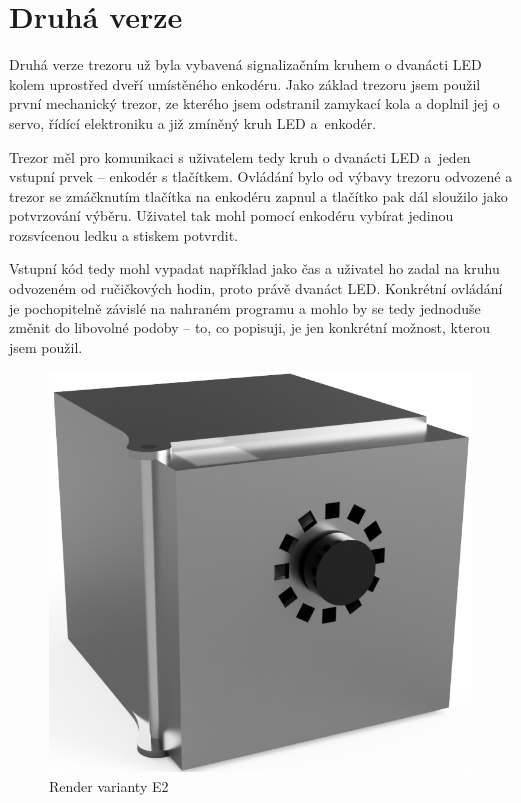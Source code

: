 \section{Druhá verze}


Druhá verze trezoru už byla vybavená signalizačním kruhem o dvanácti LED kolem uprostřed dveří
umístěného enkodéru. Jako základ trezoru jsem použil první mechanický trezor, %
 ze kterého jsem odstranil zamykací kola 
a doplnil jej o servo, řídící elektroniku a již zmíněný kruh LED a~enkodér.

Trezor měl pro komunikaci s uživatelem tedy kruh o dvanácti LED a~jeden vstupní prvek -- enkodér s tlačítkem.
Ovládání bylo od výbavy trezoru odvozené a trezor se zmáčknutím tlačítka na enkodéru zapnul a tlačítko pak dál sloužilo jako potvrzování výběru.
Uživatel tak mohl pomocí enkodéru vybírat jedinou rozsvícenou ledku a stiskem potvrdit. 

Vstupní kód tedy mohl vypadat 
například jako čas a uživatel ho zadal na kruhu odvozeném od ručičkových hodin, proto právě dvanáct LED.
Konkrétní ovládání je pochopitelně závislé na nahraném programu a mohlo by se tedy jednoduše změnit do libovolné podoby --
to, co popisuji, je jen konkrétní možnost, kterou jsem použil.

\begin{figure}[htbp]
    \centering
    \includegraphics[width=\textwidth]{kapitoly/obrazky/E2/predni_render.png}
    \caption{Render varianty E2}
    \label{fig:E2-render}
\end{figure}

\newpage